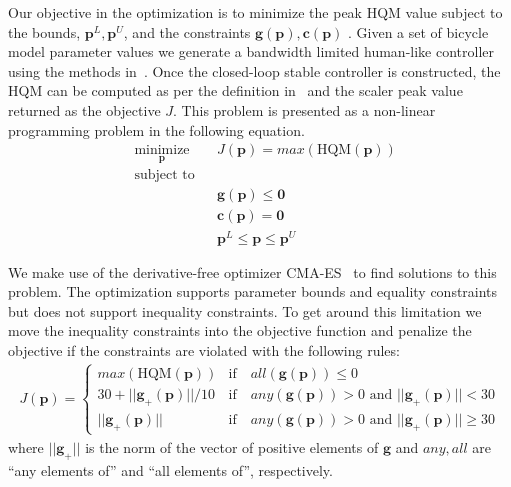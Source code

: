 \documentclass{bmd2019p}
\begin{document}
Our objective in the optimization is to minimize the peak HQM value subject to
the bounds, $\mathbf{p}^L,\mathbf{p}^U$, and the constraints
$\mathbf{g}(\mathbf{p}),\mathbf{c}(\mathbf{p})$ . Given a set of bicycle model
parameter values we generate a bandwidth limited human-like controller using
the methods in~\cite{Moore2012}. Once the closed-loop stable controller is
constructed, the HQM can be computed as per the definition in~\cite{Hess2012}
and the scaler peak value returned as the objective $J$. This problem is
presented as a non-linear programming problem in the following equation.
%
\begin{equation}
  \begin{aligned}
    & \underset{\mathbf{p}}{\text{minimize}} & & J(\mathbf{p})=max(\textrm{HQM}(\mathbf{p})) \\
    & \text{subject to} & & \\
    & & & \mathbf{g}(\mathbf{p}) \leq \mathbf{0} \\
    & & & \mathbf{c}(\mathbf{p}) = \mathbf{0} \\
    & & & \mathbf{p}^L \leq \mathbf{p} \leq \mathbf{p}^U
  \end{aligned}
\end{equation}

We make use of the derivative-free optimizer CMA-ES~\cite{Hansen1996} to find
solutions to this problem. The optimization supports parameter bounds and
equality constraints but does not support inequality constraints. To get around
this limitation we move the inequality constraints into the objective function
and penalize the objective if the constraints are violated with the following
rules:
%
\begin{align}
  J(\mathbf{p}) =
  \begin{cases}
    max(\textrm{HQM}(\mathbf{p})) & \textrm{if} \quad all(\mathbf{g}(\mathbf{p})) \leq 0 \\
    30 + ||\mathbf{g}_{+}(\mathbf{p})||/10 & \textrm{if} \quad
      any(\mathbf{g}(\mathbf{p})) > 0 \textrm{ and } ||\mathbf{g}_{+}(\mathbf{p})|| < 30 \\
    ||\mathbf{g}_{+}(\mathbf{p})|| & \textrm{if} \quad
      any(\mathbf{g}(\mathbf{p})) > 0 \textrm{ and } ||\mathbf{g}_{+}(\mathbf{p})|| \geq 30
  \end{cases}
\end{align}
where $||\mathbf{g}_{+}||$ is the norm of the vector of positive elements of
$\mathbf{g}$ and $any,all$ are ``any elements of'' and ``all elements of'',
respectively.
\end{document}
